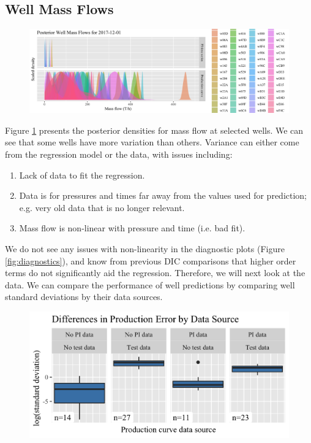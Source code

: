 \documentclass[a4paper, 12pt]{article}
\begin{document}
\subsection{Well Mass Flows}
\begin{figure}
\centering
  \includegraphics[width=\linewidth]{media/mf_wells}
  \label{fig:mf_wells}
\end{figure}

Figure \ref{fig:mf_wells} presents the posterior densities for mass flow at selected wells. We can see that some wells have more variation than others. Variance can either come from the regression model or the data, with issues including:

\begin{enumerate}
\item Lack of data to fit the regression.
\item Data is for pressures and times far away from the values used for prediction; e.g. very old data that is no longer relevant.
\item Mass flow is non-linear with pressure and time (i.e. bad fit).
\end{enumerate}

We do not see any issues with non-linearity in the diagnostic plots (Figure \ref{fig:diagnostics}), and know from previous DIC comparisons that higher order terms do not significantly aid the regression. Therefore, we will next look at the data. We can compare the performance of well predictions by comparing well standard deviations by their data sources.

\begin{figure}
  \centering
  \includegraphics[width=.5\linewidth]{media/error_source}
  \label{fig:error_source}
\end{figure}
\end{document}

